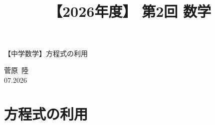 \documentclass[12pt,a4paper]{jsarticle}
\title{【2026年度】 第2回 数学}                %
\author{}                     %
\date{}                       %
\begin{document}
\begin{center}
{\LARGE 【中学数学】方程式の利用}
\end{center}

\vspace{5mm}
\begin{flushright}
  菅原\ 陸\\[1.2em]
  07.2026
\end{flushright}


\section{方程式の利用}








\bookletpadpages
\end{document}
